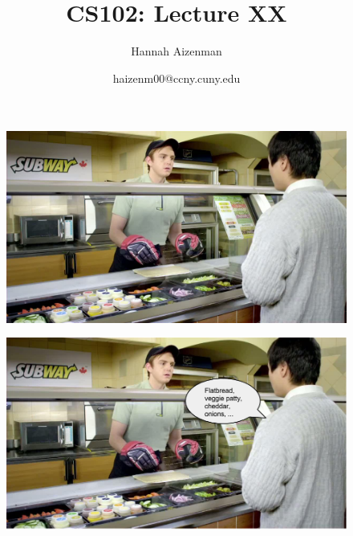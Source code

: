 \documentclass[xcolor={dvipsnames}]{beamer}
\newenvironment{changemargin}[2]{%
\begin{list}{}{%
\setlength{\topsep}{0pt}%
\setlength{\leftmargin}{#1}%
\setlength{\rightmargin}{#2}%
\setlength{\listparindent}{\parindent}%
\setlength{\itemindent}{\parindent}%
\setlength{\parsep}{\parskip}%
}%
\item[]}{\end{list}}
\begin{document}
\title{ CS102: Lecture XX}
\author{Hannah Aizenman}
\date{haizenm00@ccny.cuny.edu}


\begin{frame}
	\titlepage
\end{frame}

\begin{frame}[plain]	
	\begin{changemargin}{-1cm}{+0cm}
		\begin{figure}
			\includegraphics[width=1.20\textwidth]{subway}
		\end{figure}
	\end{changemargin}
\end{frame}

\begin{frame}[plain]	
	\begin{changemargin}{-1cm}{+0cm}
		\begin{figure}
			\includegraphics[width=1.20\textwidth]{subway_editor}
		\end{figure}
	\end{changemargin}
\end{frame}
\end{document}
